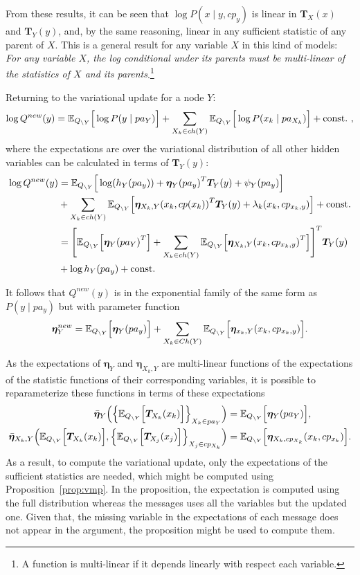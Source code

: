 From these results, it can be seen that \( \log P(x \mid y , cp_y) \) is linear in \( \bm{T}_X(x) \) and \( \bm{T}_Y(y) \), and, by the same reasoning, linear in any sufficient statistic of any parent of \( X \). This is a general result for any variable \( X \) in this kind of models: \emph{For any variable \( X \), the log conditional under its parents must be multi-linear of the statistics of \( X \) and its parents}.\footnote{A function is multi-linear if it depends linearly with respect each variable.}

Returning to the variational update for a node \( Y \):
\[
     \log Q^{new}(y) = \mathbb{E}_{Q_{\backslash Y}}\Big[\log P(y \mid pa_Y)\Big] + \sum_{X_k \in ch(Y)}\mathbb{E}_{Q_{\backslash Y}}\Big[\log P(x_k \mid pa_{X_k})\Big] + \text{const.} \ ,
\]
where the expectations are over the variational distribution of all other hidden variables can be calculated in terms of \( \bm{T}_Y(y) \):
\[
    \begin{aligned}
     \log Q^{new}(y) &= \mathbb{E}_{Q_{\backslash Y}}\Big[\log(h_Y (pa_y)) + \bm{\eta}_Y{(pa_y)}^T \bm{T}_Y(y) + \psi_Y(pa_y)\Big]\\
     &+ \sum_{X_k \in ch(Y)} \mathbb{E}_{Q_{\backslash Y}}\Big[ \bm{\eta}_{X_k, Y}{(x_{k}, cp(x_k))}^T \bm{T}_Y(y) + \lambda_{k}(x_k, cp_{x_{k},y}) \Big] + \text{const.}\\
     &= {\Bigg[ \mathbb{E}_{Q_{\backslash Y}}\Big[\bm{\eta}_Y{(pa_Y)}^T\Big] + \sum_{X_k \in ch(Y)} \mathbb{E}_{Q_{\backslash Y}}\Big[ \bm{\eta}_{X_k, Y}{(x_{k}, cp_{x_k,y})}^T\Big]  \Bigg]}^T \bm{T}_Y(y) \\
     & + \log h_{Y}(pa_y)+ \text{const.}
    \end{aligned}
\]

It follows that \( Q^{new}(y) \) is in the exponential family of the same form as \( P(y \mid pa_y) \) but with parameter function
\[
     \bm{\eta}^{new}_Y = \mathbb{E}_{Q_{\backslash Y}}\Big[\bm{\eta}_Y(pa_y)\Big] + \sum_{X_k \in Ch(Y)}\mathbb{E}_{Q_{\backslash Y}}\Big[\bm{\eta}_{x_k, Y}(x_k, cp_{x_{k},y})\Big].
\]

As the expectations of \( \bm{\eta}_Y \) and \( \bm{\eta}_{X_k, Y} \) are multi-linear functions of the expectations of the statistic functions of their corresponding variables, it is possible to reparameterize these functions in terms of these expectations
\[
     \begin{aligned}
     \bar{\bm{\eta}}_Y \Big(\Big\{ \mathbb{E}_{Q_{\backslash Y}}\Big[\bm{T}_{X_k}(x_k)\Big] \Big\}_{X_k \in pa_Y} \Big) &= \mathbb{E}_{Q_{\backslash Y}}\Big[\bm{\eta}_Y(pa_Y)\Big],\\
     \bar{\bm{\eta}}_{X_k,Y} \Big(  \mathbb{E}_{Q_{\backslash Y}}\Big[\bm{T}_{X_k}(x_k)\Big], \Big\{ \mathbb{E}_{Q_{\backslash Y}}\Big[\bm{T}_{X_j}(x_j)\Big] \Big\}_{X_j \in cp_{X_k}}\Big) &= \mathbb{E}_{Q_{\backslash Y}}\Big[\bm{\eta}_{X_k, cp_{X_k}}(x_k, cp_{x_k})\Big].\\
     \end{aligned}
\]
As a result, to compute the variational update, only the expectations of the sufficient statistics are needed, which might be computed using Proposition~\ref{prop:vmp}. In the proposition, the expectation is computed using the full distribution whereas the messages uses all the variables but the updated one. Given that, the missing variable in the expectations of each message does not appear in the argument, the proposition might be used to compute them.

